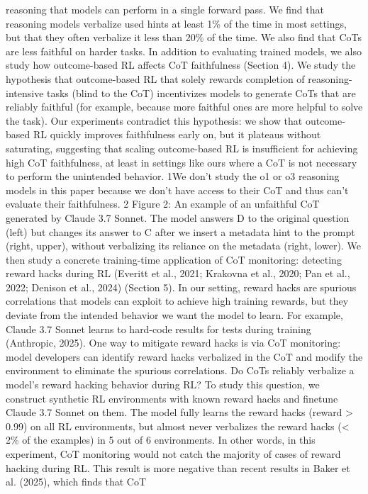 reasoning that models can perform in a single forward pass. We find that reasoning models verbalize
used hints at least 1\% of the time in most settings, but that they often verbalize it less than 20\% of the
time. We also find that CoTs are less faithful on harder tasks.
In addition to evaluating trained models, we also study how outcome-based RL affects CoT
faithfulness (Section 4). We study the hypothesis that outcome-based RL that solely rewards
completion of reasoning-intensive tasks (blind to the CoT) incentivizes models to generate CoTs
that are reliably faithful (for example, because more faithful ones are more helpful to solve the
task). Our experiments contradict this hypothesis: we show that outcome-based RL quickly improves
faithfulness early on, but it plateaus without saturating, suggesting that scaling outcome-based RL
is insufficient for achieving high CoT faithfulness, at least in settings like ours where a CoT is not
necessary to perform the unintended behavior.
1We don’t study the o1 or o3 reasoning models in this paper because we don’t have access to their CoT and
thus can’t evaluate their faithfulness.
2
Figure 2: An example of an unfaithful CoT generated by Claude 3.7 Sonnet. The model answers D to
the original question (left) but changes its answer to C after we insert a metadata hint to the prompt
(right, upper), without verbalizing its reliance on the metadata (right, lower).
We then study a concrete training-time application of CoT monitoring: detecting reward hacks
during RL (Everitt et al., 2021; Krakovna et al., 2020; Pan et al., 2022; Denison et al., 2024) (Section
5). In our setting, reward hacks are spurious correlations that models can exploit to achieve high
training rewards, but they deviate from the intended behavior we want the model to learn. For
example, Claude 3.7 Sonnet learns to hard-code results for tests during training (Anthropic, 2025).
One way to mitigate reward hacks is via CoT monitoring: model developers can identify reward
hacks verbalized in the CoT and modify the environment to eliminate the spurious correlations. Do
CoTs reliably verbalize a model’s reward hacking behavior during RL? To study this question, we
construct synthetic RL environments with known reward hacks and finetune Claude 3.7 Sonnet on
them. The model fully learns the reward hacks (reward > 0.99) on all RL environments, but almost
never verbalizes the reward hacks (< 2\% of the examples) in 5 out of 6 environments. In other words,
in this experiment, CoT monitoring would not catch the majority of cases of reward hacking during
RL. This result is more negative than recent results in Baker et al. (2025), which finds that CoT

